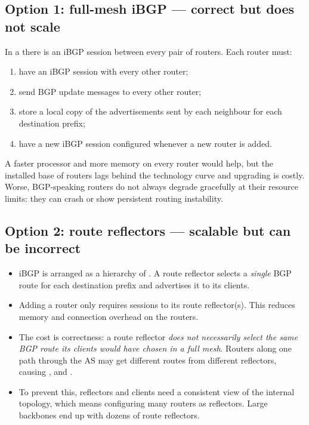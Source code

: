 \subsection{Option 1: full-mesh iBGP --- correct but does not scale}
In a  there is an iBGP session between every pair of routers. Each router must:
\begin{enumerate}[label=(\roman*)]
\item have an iBGP session with every other router;
\item send BGP update messages to every other router;
\item store a local copy of the advertisements sent by each neighbour for each destination prefix;
\item have a new iBGP session configured whenever a new router is added.
\end{enumerate}
A faster processor and more memory on every router would help, but the installed base of routers lags behind the technology curve and upgrading is costly. Worse, BGP-speaking routers do not always degrade gracefully at their resource limits: they can crash or show persistent routing instability.

\subsection{Option 2: route reflectors --- scalable but can be incorrect}
\begin{itemize}
\item iBGP is arranged as a hierarchy of . A route reflector selects a \emph{single} BGP route for each destination prefix and advertises it to its clients.
\item Adding a router only requires sessions to its route reflector(s). This reduces memory and connection overhead on the routers.
\item The cost is correctness: a route reflector \emph{does not necessarily select the same BGP route its clients would have chosen in a full mesh}. Routers along one path through the AS may get different routes from different reflectors, causing ,  and .
\item To prevent this, reflectors and clients need a consistent view of the internal topology, which means configuring many routers as reflectors. Large backbones end up with dozens of route reflectors.
\end{itemize}

